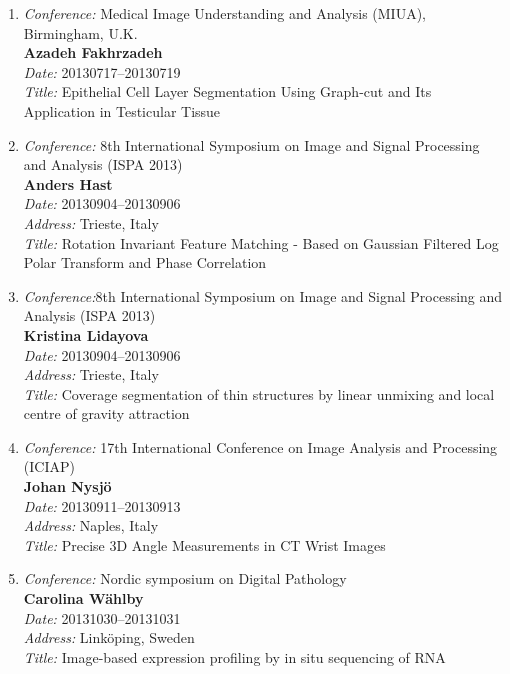 \begin{enumerate}
\item 
{\em Conference:} Medical Image Understanding and Analysis (MIUA), Birmingham, U.K.~\\
{\bf Azadeh Fakhrzadeh}~\\
{\em Date:} 20130717--20130719~\\
{\em Title:} Epithelial Cell Layer Segmentation Using Graph-cut and Its Application in Testicular Tissue





\item 
{\em Conference:}  8th International Symposium on Image and Signal Processing and Analysis (ISPA 2013)~\\
{\bf Anders Hast}~\\
{\em Date:} 20130904--20130906~\\
{\em Address:} Trieste, Italy~\\
{\em Title:} Rotation Invariant Feature Matching - Based on Gaussian Filtered Log Polar Transform and Phase Correlation

\item 
{\em Conference:}8th International Symposium on Image and Signal Processing and Analysis (ISPA 2013)~\\
{\bf Kristina Lidayova}~\\
{\em Date:} 20130904--20130906~\\
{\em Address:} Trieste, Italy~\\
{\em Title:} Coverage segmentation of thin structures by linear unmixing and local centre of gravity attraction

\item 
{\em Conference:} 17th International Conference on Image Analysis and Processing (ICIAP)~\\
{\bf Johan Nysj\"{o}}~\\
{\em Date:} 20130911--20130913~\\
{\em Address:} Naples, Italy~\\
{\em Title:} Precise 3D Angle Measurements in CT Wrist Images


\item 
{\em Conference:} Nordic symposium on Digital Pathology~\\
{\bf Carolina W\"{a}hlby}~\\
{\em Date:} 20131030--20131031~\\
{\em Address:} Link\"{o}ping, Sweden~\\
{\em Title:} Image-based expression profiling by in situ sequencing of RNA

\end{enumerate}

